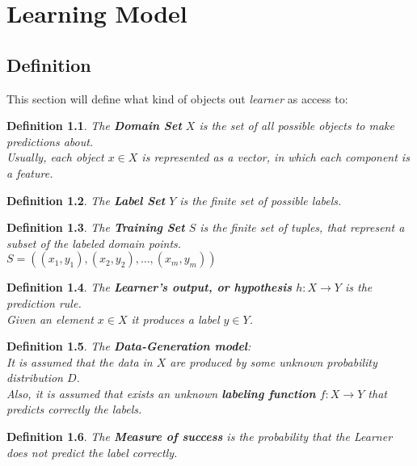 \documentclass[12pt, a4paper, english]{report}
\newtheorem{definition}{Definition}
\begin{document}
\chapter{Learning Model}
\section{Definition}
This section will define what kind of objects out \emph{learner} as access to:
\begin{definition}
    The \textbf{Domain Set} $X$ is the set of all possible objects to make predictions about.\\
    Usually, each object $x \in X$ is represented as a vector, in which each component is a \emph{feature}.
\end{definition}
\begin{definition}
    The \textbf{Label Set} $Y$ is the finite set of possible labels.
\end{definition}
\begin{definition}
    The \textbf{Training Set} $S$ is the finite set of tuples, that represent a subset of the labeled domain points.\\$S = ((x_{1}, y_{1}), (x_{2}, y_{2}), \dots, (x_{m}, y_{m}))$
\end{definition}
\begin{definition}
    The \textbf{Learner's output, or hypothesis} $h: X \rightarrow Y$ is the prediction rule.\\
    Given an element $x \in X$ it produces a label $y \in Y$.
\end{definition}
\begin{definition}
    The \textbf{Data-Generation model}:\\
    It is assumed that the data in $X$ are produced by some \emph{unknown} probability distribution $D$.\\
    Also, it is assumed that exists an \emph{unknown} \textbf{labeling function} $f:  X \rightarrow Y$ that predicts correctly the labels.
\end{definition}
\begin{definition}
    The \textbf{Measure of success} is the probability that the Learner does not predict the label correctly.
\end{definition}
\end{document}
